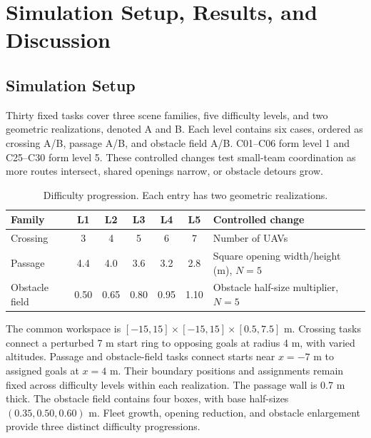 \section{Simulation Setup, Results, and Discussion}
\label{sec:experiments}
\subsection{Simulation Setup}
Thirty fixed tasks cover three scene families, five difficulty levels, and two geometric realizations, denoted A and B. Each level contains six cases, ordered as crossing A/B, passage A/B, and obstacle field A/B. C01--C06 form level 1 and C25--C30 form level 5. These controlled changes test small-team coordination as more routes intersect, shared openings narrow, or obstacle detours grow.
\begin{table}[H]
\caption{Difficulty progression. Each entry has two geometric realizations.\label{tab:cases}}
\small\begin{tabularx}{\textwidth}{lcccccY}
\toprule Family & L1 & L2 & L3 & L4 & L5 & Controlled change \\
\midrule
Crossing & 3 & 4 & 5 & 6 & 7 & Number of UAVs \\
Passage & 4.4 & 4.0 & 3.6 & 3.2 & 2.8 & Square opening width/height (m), $N=5$ \\
Obstacle field & 0.50 & 0.65 & 0.80 & 0.95 & 1.10 & Obstacle half-size multiplier, $N=5$ \\
\bottomrule\end{tabularx}
\end{table}

The common workspace is $[-15,15]\times[-15,15]\times[0.5,7.5]$ m. Crossing tasks connect a perturbed 7 m start ring to opposing goals at radius 4 m, with varied altitudes. Passage and obstacle-field tasks connect starts near $x=-7$ m to assigned goals at $x=4$ m. Their boundary positions and assignments remain fixed across difficulty levels within each realization. The passage wall is 0.7 m thick. The obstacle field contains four boxes, with base half-sizes $(0.35,0.50,0.60)$ m. Fleet growth, opening reduction, and obstacle enlargement provide three distinct difficulty progressions.

